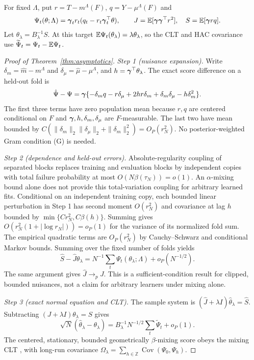 For fixed $\Lambda$, put $r=T-m^\Lambda(F)$, $q=Y-\mu^\Lambda(F)$ and
\[
\Psi_t(\theta;\Lambda)=\boldsymbol{\gamma}_t r_t(q_t-r_t\boldsymbol{\gamma}_t^\top\theta),\qquad
J=\mathbb{E}[\boldsymbol{\gamma}\boldsymbol{\gamma}^\top r^2],\quad S=\mathbb{E}[\boldsymbol{\gamma} rq].
\]
Let $\theta_\lambda=B_\lambda^{-1}S$. At this target $\mathbb{E}\Psi_t(\theta_\lambda)=\lambda\theta_\lambda$, so the CLT and HAC covariance use $\widetilde\Psi_t=\Psi_t-\mathbb{E}\Psi_t$.

\begin{proof}[Proof of Theorem~\ref{thm:asymptotics}]
\emph{Step 1 (nuisance expansion).} Write $\delta_m=\hat m-m^\Lambda$ and $\delta_\mu=\hat\mu-\mu^\Lambda$, and $h=\boldsymbol{\gamma}^\top\theta_\lambda$. The exact score difference on a held-out fold is
\[
\hat\Psi-\Psi
=\boldsymbol{\gamma}\{-\delta_m q-r\delta_\mu+2hr\delta_m
 +\delta_m\delta_\mu-h\delta_m^2\}.
\]
The first three terms have zero population mean because $r,q$ are centered conditional on $F$ and $\boldsymbol{\gamma},h,\delta_m,\delta_\mu$ are $F$-measurable. The last two have mean bounded by $C(\|\delta_m\|_2\|\delta_\mu\|_2+\|\delta_m\|_2^2)=O_P(r_N^2)$. No posterior-weighted Gram condition (G) is needed.

\emph{Step 2 (dependence and held-out errors).} Absolute-regularity coupling of separated blocks \citep{yu1994rates} replaces training and evaluation blocks by independent copies with total failure probability at most $O(N\beta(\tau_N))=o(1)$. An $\alpha$-mixing bound alone does not provide this total-variation coupling for arbitrary learned fits. Conditional on an independent training copy, each bounded linear perturbation in Step 1 has second moment $O(r_N^2)$ and covariance at lag $h$ bounded by $\min\{Cr_N^2,C\beta(h)\}$. Summing gives $O(r_N^2(1+|\log r_N|))=o_P(1)$ for the variance of its normalized fold sum. The empirical quadratic terms are $O_P(r_N^2)$ by Cauchy--Schwarz and conditional Markov bounds. Summing over the fixed number of folds yields
\[
\hat S-\hat J\theta_\lambda
=N^{-1}\sum_t\Psi_t(\theta_\lambda;\Lambda)+o_P(N^{-1/2}).
\]
The same argument gives $\hat J\to_p J$. This is a sufficient-condition result for clipped, bounded nuisances, not a claim for arbitrary learners under mixing alone.

\emph{Step 3 (exact normal equation and CLT).} The sample system is $(\hat J+\lambda I)\hat\theta_\lambda=\hat S$. Subtracting $(J+\lambda I)\theta_\lambda=S$ gives
\[
\sqrt N(\hat\theta_\lambda-\theta_\lambda)
=B_\lambda^{-1}N^{-1/2}\sum_t\widetilde\Psi_t+o_P(1).
\]
The centered, stationary, bounded geometrically $\beta$-mixing score obeys the mixing CLT \citep{ibragimov1962some}, with long-run covariance $\Omega_\lambda=\sum_{h\in\mathbb Z}\operatorname{Cov}(\Psi_0,\Psi_h)$.


\end{proof}
